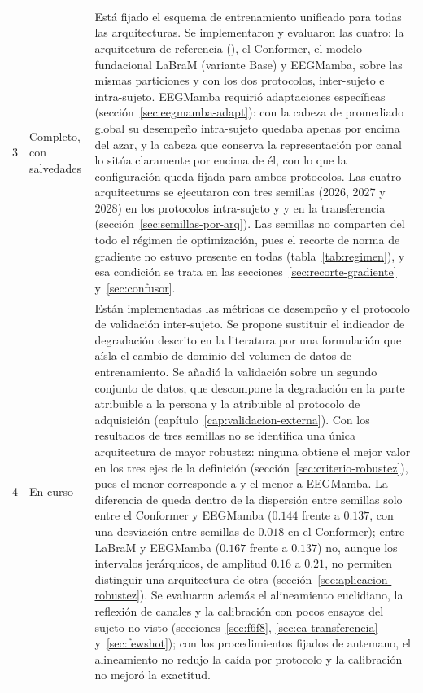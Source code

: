 \begin{longtable}{@{}p{0.8cm}p{2.2cm}p{10.5cm}@{}}
3 & Completo, con salvedades & Está fijado el esquema de entrenamiento unificado para todas las
arquitecturas. Se implementaron y evaluaron las cuatro: la arquitectura de
referencia (\eegnet{}), el Conformer, el modelo fundacional LaBraM (variante Base) y
EEGMamba, sobre las mismas particiones y con los dos protocolos, inter-sujeto e
intra-sujeto. EEGMamba requirió adaptaciones específicas
(sección~\ref{sec:eegmamba-adapt}): con la cabeza de promediado global su desempeño
intra-sujeto quedaba apenas por encima del azar, y la cabeza que conserva la
representación por canal lo sitúa claramente por encima de él, con lo que la configuración
queda fijada para ambos protocolos. Las cuatro arquitecturas se ejecutaron con tres semillas (2026, 2027 y 2028) en los protocolos
intra-sujeto y \loso{} y en la transferencia (sección~\ref{sec:semillas-por-arq}). Las semillas no
comparten del todo el régimen de optimización, pues el recorte de norma de gradiente no estuvo
presente en todas (tabla~\ref{tab:regimen}), y esa condición se trata en las
secciones~\ref{sec:recorte-gradiente} y~\ref{sec:confusor}. \\
\addlinespace

4 & En curso & Están implementadas las métricas de desempeño y el protocolo de
validación inter-sujeto. Se propone sustituir el indicador de degradación
descrito en la literatura por una formulación que aísla el cambio de dominio
del volumen de datos de entrenamiento. Se añadió la validación sobre un segundo
conjunto de datos, que descompone la degradación en la parte atribuible a la persona
y la atribuible al protocolo de adquisición
(capítulo~\ref{cap:validacion-externa}). Con los resultados de tres semillas no se identifica
una única arquitectura de mayor robustez: ninguna obtiene el mejor valor en los tres ejes de la
definición (sección~\ref{sec:criterio-robustez}), pues el menor \dsi{} corresponde a \eegnet{} y el
menor \idp{} a EEGMamba. La diferencia de \idp{} queda dentro de la dispersión entre semillas solo
entre el Conformer y EEGMamba ($0.144$ frente a $0.137$, con una desviación entre semillas de $0.018$
en el Conformer); entre LaBraM y EEGMamba ($0.167$ frente a $0.137$) no, aunque los intervalos jerárquicos, de amplitud $0.16$ a $0.21$, no permiten
distinguir una arquitectura de otra (sección~\ref{sec:aplicacion-robustez}). Se evaluaron además el alineamiento euclidiano, la reflexión
de canales y la calibración con pocos ensayos del sujeto no visto (secciones~\ref{sec:f6f8}, \ref{sec:ea-transferencia} y~\ref{sec:fewshot}); con
los procedimientos fijados de antemano, el alineamiento no redujo la caída por protocolo y la
calibración no mejoró la exactitud. \\

\bottomrule
\end{longtable}

